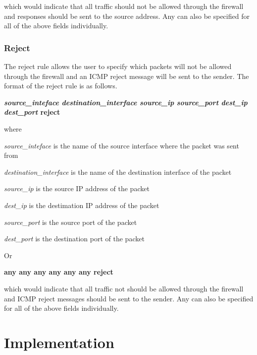 \documentclass[12pt]{article} %
\begin{document}
which would indicate that all traffic should not be allowed through the firewall and responses should be sent to the source address. Any can also be
specified for all of the above fields individually.


\subsubsection{Reject} %
The reject rule allows the user to specify which packets will not be allowed through the firewall and an ICMP reject 
message will be sent to the sender. The format of the 
reject rule is as follows. 

\vspace{1pc}
\textbf{\emph{source\_inteface} \emph{destination\_interface} \emph{source\_ip} \emph{source\_port} \emph{dest\_ip} \emph{dest\_port} reject}
\vspace{1pc}

where

\emph{source\_inteface} is the name of the source interface where the packet was sent from

\emph{destination\_interface} is the name of the destination interface of the packet

\emph{source\_ip} is the source IP address of the packet

\emph{dest\_ip} is the destimation IP address of the packet

\emph{source\_port} is the source port of the packet

\emph{dest\_port} is the destination port of the packet 

\vspace{2pc}
Or

\vspace{2pc}
\textbf{any any any any any any reject}
\vspace{2pc}

which would indicate that all traffic not should be allowed through the firewall and ICMP reject messages should be sent to the sender. Any can also
be specified for all of the above fields individually.




\section{Implementation} %
\end{document}
